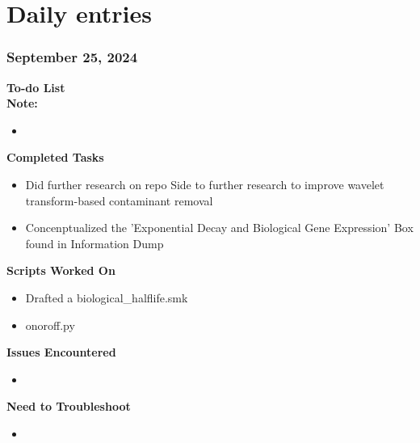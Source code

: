 \documentclass[11pt]{report}
\newcommand{\done}{\checkmark}
\begin{document}
{\newpage






\nolinenumbers
\part{Daily entries}

\pagestyle{fancy}
\fancyhf{}
\fancyhead[C]{\leftmark}  %
\fancyhead[R]{\thepage}

\renewcommand{\thesection}{\arabic{section}}
\setcounter{section}{0}
\setcounter{subsection}{0}

\section{September 25, 2024}


\textbf{To-do List} \\
\textbf{Note:} 

\begin{itemize}
	\item [\done] 
	
	
\end{itemize}

\textbf{Completed Tasks}
\begin{itemize}
	\item Did further research on repo Side to further research to improve wavelet transform-based contaminant removal 
	\item Concenptualized the 'Exponential Decay and Biological Gene Expression' Box found in Information Dump
\end{itemize}

\textbf{Scripts Worked On}
\begin{itemize}
	\item Drafted a biological\_halflife.smk
	\item onoroff.py
\end{itemize}


\textbf{Issues Encountered}
\begin{itemize}
	\item 
\end{itemize}

\textbf{Need to Troubleshoot}
\begin{itemize}
	\item 
\end{itemize}
\newpage

}
\end{document}
